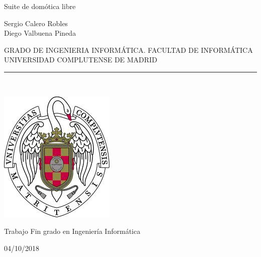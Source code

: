 \begin{center}

   \vspace{1cm}


   {\Large Suite de domótica libre}\\

   \vspace{1cm}

   {\large
    Sergio Calero Robles\\
    Diego Valbuena Pineda\\
    }

   \vspace{0.5cm}




   GRADO DE INGENIERIA INFORMÁTICA. FACULTAD DE INFORMÁTICA\\
   UNIVERSIDAD COMPLUTENSE DE MADRID \\


   \vspace{0.65cm}
   \rule{2in}{0.5pt}\\
   \vspace{0.85cm}

  \includegraphics[height=2.5in]{figures/escudo.jpg}


   \vspace{0.5cm}
    Trabajo Fin grado en Ingeniería Informática

   \vspace{0.5cm}






  04/10/2018\\
   \vspace{1cm}

\end{center}

